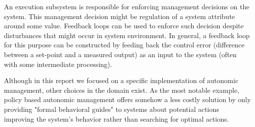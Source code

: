 An execution subsystem is responsible for enforcing management decisions on the system.
This management decision might be regulation of a system attribute around some value.
Feedback loops can be used to enforce such decision despite disturbances that might occur in system environment. In general, a feedback loop for this purpose can be constructed by feeding back the control error (difference between a set-point and a measured output) as an input to the system (often with some intermediate processing). 

Although in this report we focused on a specific implementation of autonomic management, other choices in the domain exist. As the most notable example, policy based autonomic management offers somehow a less costly solution by only providing "formal behavioral guides" to systems about potential actions improving the system's behavior rather than searching for optimal actions.



